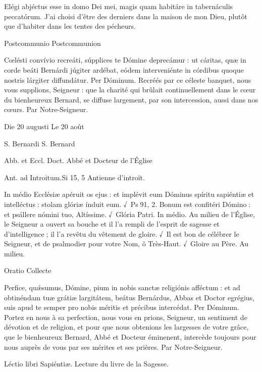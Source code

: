 \begin{paracol}{2}
Elégi abjéctus esse in domo Dei mei, magis quam habitáre in tabernáculis peccatórum.
\switchcolumn
J’ai choisi d’être des derniers dans la maison de mon Dieu, plutôt que d’habiter dans les tentes des pécheurs.
\switchcolumn*

Postcommunio
\switchcolumn
Postcommunion
\switchcolumn*

Cœlésti convívio recreáti, súpplices  te Dómine deprecámur : ut cáritas, quæ in corde beáti Bernárdi júgiter ardébat, eódem interveniénte in córdibus quoque nostris lárgiter diffundátur. Per Dóminum.
\switchcolumn
Recréés par ce céleste banquet, nous  vous supplions, Seigneur : que la charité qui brûlait continuellement dans le cœur du bienheureux Bernard, se diffuse largement, par son intercession, aussi dans nos cœurs. Par Notre-Seigneur.
\switchcolumn*

Die 20 augusti
\switchcolumn
Le 20 août
\switchcolumn*

S. Bernardi
\switchcolumn
S. Bernard
\switchcolumn*

Abb. et Eccl. Doct.
\switchcolumn
Abbé et Docteur de l’Église
\switchcolumn*

Ant. ad Introitum.\hfill Si 15, 5
\switchcolumn
Antienne d’introït.
\switchcolumn*

In médio Ecclésiæ apéruit os ejus :  et implévit eum Dóminus spíritu sapiéntiæ et intelléctus : stolam glóriæ índuit eum. √~Ps 91, 2. Bonum est confitéri Dómino : et psállere nómini tuo, Altíssime. √~Glória Patri. In médio.
\switchcolumn
Au milieu de l’Église, le Seigneur a ouvert sa bouche et il l’a rempli de l’esprit de sagesse et d’intelligence ; il l’a revêtu du vêtement de gloire. √~Il est bon de célébrer le Seigneur, et de psalmodier pour votre Nom, ô Très-Haut. √~Gloire au Père. Au milieu.
\switchcolumn*

Oratio
\switchcolumn
Collecte
\switchcolumn*

Perfice, quǽsumus, Dómine, pium in  nobis sanctæ religiónis afféctum : et ad obtinéndam  tuæ grátiæ largitátem, beátus Bernárdus, Abbas et Doctor egrégius, suis apud te semper pro nobis méritis et précibus intercédat. Per Dóminum.
\switchcolumn
Portez en nous à sa perfection, nous vous  en prions, Seigneur, un sentiment de dévotion et de religion, et pour que nous obtenions les largesses de votre grâce, que le bienheureux Bernard, Abbé et Docteur éminenent, intercède toujours pour nous auprès de vous par ses mérites et ses prières. Par Notre-Seigneur.
\switchcolumn*

Léctio libri Sapiéntiæ.
\switchcolumn
Lecture du livre de la Sagesse.
\switchcolumn*


\end{paracol}
